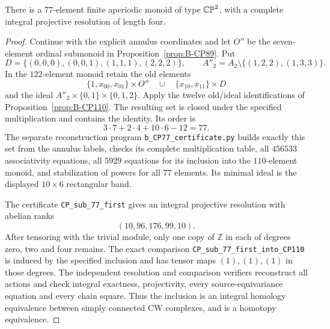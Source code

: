 \begin{proposition}\label{prop:B-CP77}
There is a $77$-element finite aperiodic monoid of type $\mathbb {CP}^2$,
with a complete integral projective resolution of length four.
\end{proposition}
\begin{proof}
Continue with the explicit annulus coordinates and let $O''$ be the
seven-element ordinal submonoid in Proposition~\ref{prop:B-CP89}.
Put
\[
 D=\{(0,0,0),(0,0,1),(1,1,1),(2,2,2)\},\qquad
 A''_2=A_2\setminus\{(1,2,2),(1,3,3)\}.
\]
In the $122$-element monoid retain the old elements
\[
 \{1,x_{00},x_{01}\}\times O''
 \quad\cup\quad
 \{x_{10},x_{11}\}\times D
\]
and the ideal
$A''_2\times\{0,1\}\times\{0,1,2\}$.
Apply the twelve old/ideal identifications of
Proposition~\ref{prop:B-CP110}.  The resulting set is closed under
the specified multiplication and contains the identity.  Its order is
\[
 3\cdot7+2\cdot4+10\cdot6-12=77.
\]
The separate reconstruction program
\texttt{b\_CP77\_certificate.py} builds exactly this set from the
annulus labels, checks its complete multiplication table, all
$456533$ associativity equations, all $5929$ equations for its
inclusion into the $110$-element monoid, and stabilization of powers
for all $77$ elements.  Its minimal ideal is the displayed
$10\times6$ rectangular band.

The certificate \texttt{CP\_sub\_77\_first} gives an integral
projective resolution with abelian ranks
\[
 (10,96,176,99,10).
\]
After tensoring with the trivial module, only one copy of $\mathbb Z$
in each of degrees zero, two and four remains.  The exact comparison
\texttt{CP\_sub\_77\_first\_into\_CP110} is induced by the
specified inclusion and has tensor maps $(1),(1),(1)$ in those
degrees.  The independent resolution and comparison verifiers
reconstruct all actions and check integral exactness, projectivity,
every source-equivariance equation and every chain square.
Thus the inclusion is an integral homology equivalence between
simply connected CW complexes, and is a homotopy equivalence.
\end{proof}












